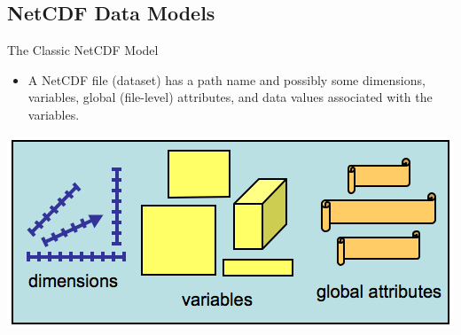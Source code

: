 \documentclass[compress,11pt,xcolor=svgnames,aspectratio=169]{beamer}
\begin{document}
\subsection{NetCDF Data Models}

\begin{frame}[t]{The Classic NetCDF Model}

\begin{itemize}

\item A NetCDF file (dataset) has a path name and possibly some dimensions, variables, global (file-level) attributes, and data values associated with the variables.

\end{itemize}

\begin{center}
\includegraphics[scale=0.6]{fig/netcdf-classic}
\end{center}

\nocite{netcdf}

\end{frame}
\end{document}
